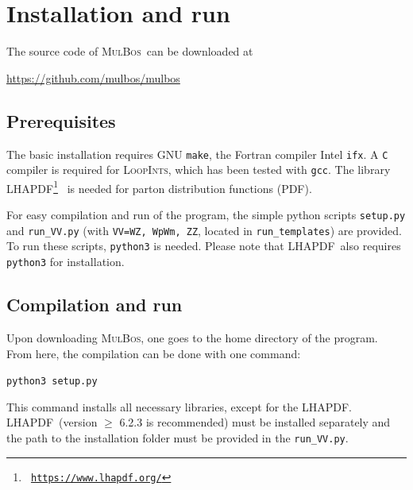 \documentclass[english,12pt]{article}
\newcommand{\mulbos}{\textsc{MulBos}}
\newcommand{\loopints}{\textsc{LoopInts}}
\newcommand{\lhapdf}{\textsc{LHAPDF}}
\begin{document}
\newpage

\tableofcontents

\newpage

\section{Installation and run}
The source code of \mulbos\ can be downloaded at

\begin{center}
\url{https://github.com/mulbos/mulbos}
\end{center}


\subsection{Prerequisites}

The basic installation requires GNU {\tt make}, the {\sc Fortran} compiler Intel {\tt ifx}. 
A {\tt C} compiler is required for \loopints , which has been 
tested with {\tt gcc}.
The library \lhapdf \footnote{\tt
\url{https://www.lhapdf.org/}}~\cite{Buckley:2014ana} is needed
for parton distribution functions (PDF). 

For easy compilation and run of the program, the simple python scripts {\tt setup.py} 
and {\tt run\_VV.py} (with {\tt VV=WZ, WpWm, ZZ}, located in {\tt run\_templates}) are provided. 
To run these scripts, {\tt python3} is needed. 
Please note that \lhapdf\ also requires {\tt python3} for installation. 

\subsection{Compilation and run}
\label{sec:compile}
Upon downloading \mulbos, one goes to the home directory of the program. 
From here, the compilation can be done with one command: 
\begin{center}
{\tt python3 setup.py}
\end{center}
This command installs all necessary libraries, except for the \lhapdf. 
\lhapdf\ (version $\ge$ 6.2.3 is recommended) must be installed separately 
and the path to the installation folder must be provided in the {\tt run\_VV.py}.
\end{document}

